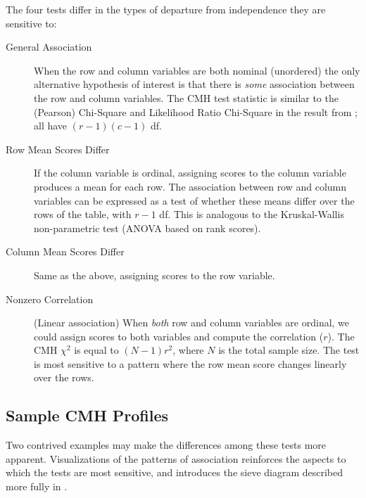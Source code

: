 \documentclass[11pt]{book}\usepackage[]{graphicx}\usepackage[]{color}
\begin{document}
The four tests differ in the types of departure from
independence they are sensitive to:

\begin{description}
\item[General Association]  When the row and column
       variables are both nominal (unordered) the only alternative
       hypothesis of interest is that there is \emph{some} association
       between the row and column variables.  The CMH test statistic
       is similar to the (Pearson) Chi-Square and Likelihood Ratio
       Chi-Square in the result from ; all have \((r - 1) (c -
       1)\) df.

\item[Row Mean Scores Differ]  If the column variable is
       ordinal, assigning scores to the column variable produces a
       mean for each row.  The association between row and column
       variables can be expressed as a test of whether these means
       differ over the rows of the table, with \(r - 1\) df.  This
       is analogous to the Kruskal-Wallis non-parametric test (ANOVA
       based on rank scores).
\item[Column Mean Scores Differ]  Same as the above, assigning scores to
  the row variable.

\item[Nonzero Correlation] (Linear association)  When \emph{both} row and
       column variables are ordinal, we could assign scores to both
       variables and compute the correlation ($r$).  The CMH
       \(\chi^2\) is equal to \(( N - 1) r^2\), where $N$ is the total
       sample size.  The test is most sensitive to a pattern where
       the row mean score changes linearly over the rows.
\end{description}

\subsection{Sample CMH Profiles}\label{sec:Sample}

Two contrived examples may make the differences among these tests
more apparent.  Visualizations of the patterns of association
reinforces the aspects to which the tests are most sensitive,
and introduces the sieve diagram described more fully in .
\end{document}
